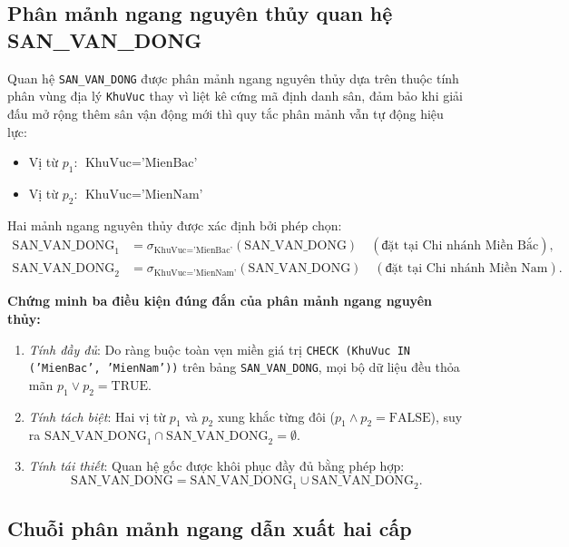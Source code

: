 \subsection{Phân mảnh ngang nguyên thủy quan hệ SAN\_VAN\_DONG}
Quan hệ \texttt{SAN\_VAN\_DONG} được phân mảnh ngang nguyên thủy dựa trên thuộc tính phân vùng địa lý \texttt{KhuVuc} thay vì liệt kê cứng mã định danh sân, đảm bảo khi giải đấu mở rộng thêm sân vận động mới thì quy tắc phân mảnh vẫn tự động hiệu lực:
\begin{itemize}
    \item Vị từ $p_1$: $\text{KhuVuc} = \text{'MienBac'}$
    \item Vị từ $p_2$: $\text{KhuVuc} = \text{'MienNam'}$
\end{itemize}
Hai mảnh ngang nguyên thủy được xác định bởi phép chọn:
\begin{align*}
    \text{SAN\_VAN\_DONG}_1 &= \sigma_{\text{KhuVuc} = \text{'MienBac'}}(\text{SAN\_VAN\_DONG}) \quad (\text{đặt tại Chi nhánh Miền Bắc}), \\
    \text{SAN\_VAN\_DONG}_2 &= \sigma_{\text{KhuVuc} = \text{'MienNam'}}(\text{SAN\_VAN\_DONG}) \quad (\text{đặt tại Chi nhánh Miền Nam}).
\end{align*}

\textbf{Chứng minh ba điều kiện đúng đắn của phân mảnh ngang nguyên thủy:}
\begin{enumerate}
    \item \textit{Tính đầy đủ}: Do ràng buộc toàn vẹn miền giá trị \texttt{CHECK (KhuVuc IN ('MienBac', 'MienNam'))} trên bảng \texttt{SAN\_VAN\_DONG}, mọi bộ dữ liệu đều thỏa mãn $p_1 \lor p_2 = \text{TRUE}$.
    \item \textit{Tính tách biệt}: Hai vị từ $p_1$ và $p_2$ xung khắc từng đôi ($p_1 \land p_2 = \text{FALSE}$), suy ra $\text{SAN\_VAN\_DONG}_1 \cap \text{SAN\_VAN\_DONG}_2 = \emptyset$.
    \item \textit{Tính tái thiết}: Quan hệ gốc được khôi phục đầy đủ bằng phép hợp:
    $$\text{SAN\_VAN\_DONG} = \text{SAN\_VAN\_DONG}_1 \cup \text{SAN\_VAN\_DONG}_2.$$
\end{enumerate}

\subsection{Chuỗi phân mảnh ngang dẫn xuất hai cấp}

